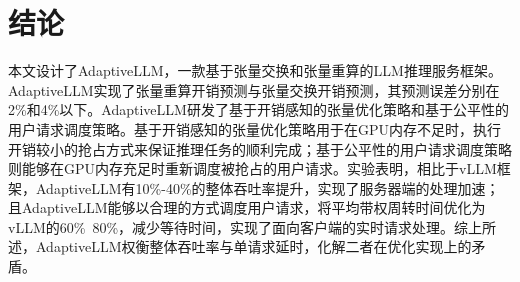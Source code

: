 \section{结论}

本文设计了AdaptiveLLM，一款基于张量交换和张量重算的LLM推理服务框架。AdaptiveLLM实现了张量重算开销预测与张量交换开销预测，其预测误差分别在2\%和4\%以下。AdaptiveLLM研发了基于开销感知的张量优化策略和基于公平性的用户请求调度策略。基于开销感知的张量优化策略用于在GPU内存不足时，执行开销较小的抢占方式来保证推理任务的顺利完成；基于公平性的用户请求调度策略则能够在GPU内存充足时重新调度被抢占的用户请求。实验表明，相比于vLLM框架，AdaptiveLLM有10\%-40\%的整体吞吐率提升，实现了服务器端的处理加速；且AdaptiveLLM能够以合理的方式调度用户请求，将平均带权周转时间优化为vLLM的60\%~80\%，减少等待时间，实现了面向客户端的实时请求处理。综上所述，AdaptiveLLM权衡整体吞吐率与单请求延时，化解二者在优化实现上的矛盾。